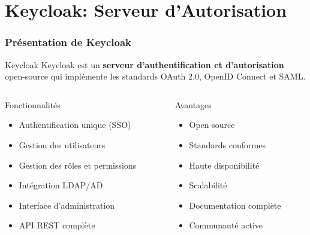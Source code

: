 \documentclass[aspectratio=169]{beamer}
\begin{document}
\section{Keycloak: Serveur d'Autorisation}

\begin{frame}
    \frametitle{Présentation de Keycloak}
    \begin{alertblock}{Keycloak}
        \Large Keycloak est un \textbf{serveur d'authentification et d'autorisation} open-source qui implémente les standards OAuth 2.0, OpenID Connect et SAML.
    \end{alertblock}
    
    \vspace{0.5cm}
    \begin{columns}
        \begin{column}{0.5\textwidth}
            \begin{block}{Fonctionnalités}
                \begin{itemize}
                    \item \textcolor{primaryblue}{Authentification unique (SSO)}
                    \item \textcolor{accentgreen}{Gestion des utilisateurs}
                    \item \textcolor{warningorange}{Gestion des rôles et permissions}
                    \item \textcolor{errorred}{Intégration LDAP/AD}
                    \item \textcolor{primaryblue}{Interface d'administration}
                    \item \textcolor{accentgreen}{API REST complète}
                \end{itemize}
            \end{block}
        \end{column}
        \begin{column}{0.5\textwidth}
            \begin{block}{Avantages}
                \begin{itemize}
                    \item \textcolor{accentgreen}{Open source}
                    \item \textcolor{primaryblue}{Standards conformes}
                    \item \textcolor{warningorange}{Haute disponibilité}
                    \item \textcolor{errorred}{Scalabilité}
                    \item \textcolor{primaryblue}{Documentation complète}
                    \item \textcolor{accentgreen}{Communauté active}
                \end{itemize}
            \end{block}
        \end{column}
    \end{columns}
\end{frame}
\end{document}
